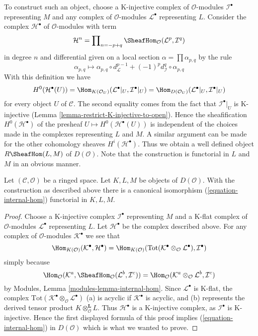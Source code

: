 \medskip\noindent
To construct such an object, choose a K-injective complex of
$\mathcal{O}$-modules $\mathcal{I}^\bullet$ representing $M$ and any
complex of $\mathcal{O}$-modules $\mathcal{L}^\bullet$ representing $L$.
Consider the complex $\mathcal{H}^\bullet$
of $\mathcal{O}$-modules with term
$$
\mathcal{H}^n =
\prod\nolimits_{n = - p + q}
\SheafHom_\mathcal{O}(\mathcal{L}^p, \mathcal{I}^q)
$$
in degree $n$ and differential given on a local section
$\alpha = \prod \alpha_{p, q}$ by the rule
$$
\alpha_{p, q}
\longmapsto
\alpha_{p, q} \circ d_{\mathcal{L}}^{p - 1} +
(-1)^pd_{\mathcal{I}}^q \circ \alpha_{p, q}
$$
With this definition we have
$$
H^0(\mathcal{H}^\bullet(U)) =
\Hom_{K(\mathcal{O}_U)}(\mathcal{L}^\bullet|_U, \mathcal{I}^\bullet|_U) =
\Hom_{D(\mathcal{O}_U)}(\mathcal{L}^\bullet|_U, \mathcal{I}^\bullet|_U)
$$
for every object $U$ of $\mathcal{C}$.
The second equality comes from the fact that $\mathcal{I}^\bullet|_U$
is K-injective (Lemma \ref{lemma-restrict-K-injective-to-open}).
Hence the sheafification $H^0(\mathcal{H}^\bullet)$ of the presheaf
$U \mapsto H^0(\mathcal{H}^\bullet(U))$ is independent of the choices
made in the complexes representing $L$ and $M$. A similar argument can
be made for the other cohomology sheaves $H^i(\mathcal{H}^\bullet)$.
Thus we obtain a well
defined object $R\SheafHom(L, M)$ of $D(\mathcal{O})$. Note that
the construction is functorial in $L$ and $M$ in an obvious manner.

\begin{lemma}
\label{lemma-internal-hom}
Let $(\mathcal{C}, \mathcal{O})$ be a ringed space. Let $K, L, M$ be objects
of $D(\mathcal{O})$. With the construction as described above
there is a canonical isomorphism (\ref{equation-internal-hom})
functorial in $K, L, M$.
\end{lemma}

\begin{proof}
Choose a K-injective complex $\mathcal{I}^\bullet$ representing
$M$ and a K-flat complex of $\mathcal{O}$-modules $\mathcal{L}^\bullet$
representing $L$. Let $\mathcal{H}^\bullet$ be the complex described above.
For any complex of $\mathcal{O}$-modules $\mathcal{K}^\bullet$ we see that
$$
\Hom_{K(\mathcal{O})}(\mathcal{K}^\bullet, \mathcal{H}^\bullet)
=
\Hom_{K(\mathcal{O})}(
\text{Tot}(\mathcal{K}^\bullet \otimes_\mathcal{O} \mathcal{L}^\bullet),
\mathcal{I}^\bullet)
$$
simply because
$$
\Hom_\mathcal{O}(
\mathcal{K}^a, \SheafHom_\mathcal{O}(\mathcal{L}^b, \mathcal{I}^c))
=
\Hom_\mathcal{O}(
\mathcal{K}^a \otimes_\mathcal{O} \mathcal{L}^b, \mathcal{I}^c)
$$
by Modules, Lemma \ref{modules-lemma-internal-hom}. Since $\mathcal{L}^\bullet$
is K-flat, the complex
$\text{Tot}(\mathcal{K}^\bullet \otimes_\mathcal{O} \mathcal{L}^\bullet)$
(a) is acyclic if $\mathcal{K}^\bullet$ is acyclic, and
(b) represents the derived tensor product
$K \otimes_\mathcal{O}^\mathbf{L} L$. Thus $\mathcal{H}^\bullet$
is a K-injective complex, as $\mathcal{I}^\bullet$ is K-injective.
Hence the first displayed formula of this proof implies
(\ref{equation-internal-hom})
in $D(\mathcal{O})$ which is what we wanted to prove.
\end{proof}

